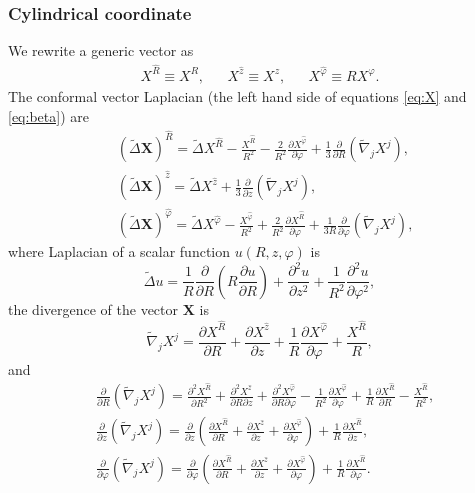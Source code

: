 \subsubsection*{Cylindrical coordinate}
We rewrite a generic vector as
\begin{align}
	&X^{\hat{R}} \equiv X^{R} ,&
	&X^{\hat{z}} \equiv X^{z} ,&
	&X^{\hat{\varphi}} \equiv R X^{\varphi}. &
\end{align}
The conformal vector Laplacian (the left hand side of equations \eqref{eq:X} and \eqref{eq:beta}) are
\begin{align}
	&(\tilde{\Delta} \bm{X})^{\hat{R}} = \tilde{\Delta} X^{\hat{R}} 
	- \frac{X^{\hat{R}}}{R^2} - \frac{2}{R^2} \frac{\partial X^{\hat{\varphi}}}{\partial \varphi}  
	+ \frac{1}{3}\frac{\partial }{\partial R} \left( \tilde{\nabla}_j  X^j \right),  \\
	&(\tilde{\Delta} \bm{X})^{\hat{z}} = \tilde{\Delta} X^{\hat{z}} 
        + \frac{1}{3}\frac{\partial }{\partial z}\left( \tilde{\nabla}_j  X^j \right), \\
	&(\tilde{\Delta} \bm{X})^{\hat{\varphi}} = \tilde{\Delta} X^{\hat{\varphi}} - \frac{X^{\hat{\varphi}}}{R^2} + \frac{2}{R^2} \frac{\partial X^{\hat{R}}}{\partial \varphi}  
        + \frac{1}{3R}\frac{\partial }{\partial \varphi}\left( \tilde{\nabla}_j  X^j \right), 
\end{align}
where Laplacian of a scalar function $u(R,z,\varphi)$ is 
\begin{equation}
	\tilde{\Delta} u = \frac{1}{R}\frac{\partial}{\partial R}\left(R\frac{\partial u}{\partial R}\right) 
+ \frac{\partial^2 u}{\partial z^2}
+ \frac{1}{R^2}\frac{\partial^2 u }{\partial \varphi^2},
\end{equation}
the divergence of the vector $\bm{X}$ is
\begin{equation}
	\tilde{\nabla}_j X^j = \frac{\partial X^{\hat{R}}}{\partial R} 
	+ \frac{\partial X^{\hat{z}} }{\partial z}
	+ \frac{1}{R}\frac{\partial X^{\hat{\varphi}} }{\partial \varphi} + \frac{X^{\hat{R}}}{R}
	,
\end{equation}
and
\begin{align}
	&\frac{\partial }{\partial R} \left( \tilde{\nabla}_j X^j \right) = \frac{\partial^2 X^{\hat{R}}}{\partial R^2} + \frac{\partial^2 X^{\hat{z}}}{\partial R \partial z} + \frac{\partial^2 X^{\hat{\varphi}}}{\partial R \partial \varphi} - \frac{1}{R^2}\frac{\partial X^{\hat{\varphi}}}{\partial \varphi} + \frac{1}{R}\frac{\partial X^{\hat{R}}}{\partial R} - \frac{X^{\hat{R}}}{R^2} ,\\
	&\frac{\partial }{\partial z} \left( \tilde{\nabla}_j X^j \right) = \frac{\partial }{\partial z} \left( \frac{\partial X^{\hat{R}}}{\partial R} + \frac{\partial X^{\hat{z}}}{\partial z} + \frac{\partial X^{\hat{\varphi}}}{\partial \varphi} \right) + \frac{1}{R}\frac{\partial X^{\hat{R}}}{\partial z} ,\\
	&\frac{\partial }{\partial \varphi} \left( \tilde{\nabla}_j X^j \right) = \frac{\partial }{\partial \varphi} \left( \frac{\partial X^{\hat{R}}}{\partial R} + \frac{\partial X^{\hat{z}}}{\partial z} + \frac{\partial X^{\hat{\varphi}}}{\partial \varphi} \right) + \frac{1}{R}\frac{\partial X^{\hat{R}}}{\partial \varphi} .
\end{align}

